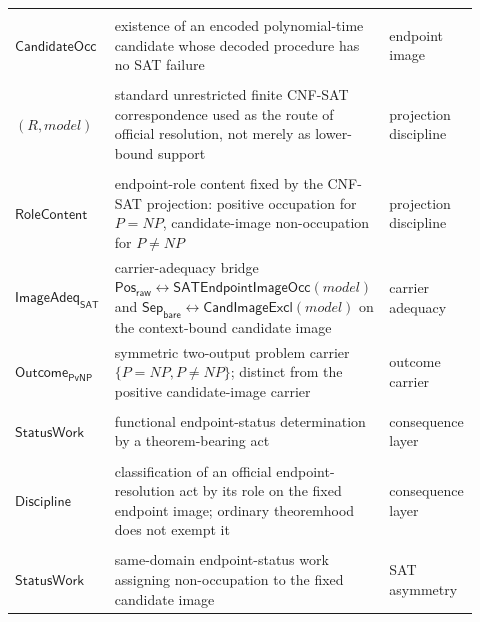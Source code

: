 \documentclass[11pt]{article}
\theoremstyle{definition}
\theoremstyle{remark}
\newcommand{\PosRaw}{\mathsf{Pos}_{\mathsf{raw}}}
\newcommand{\SepBare}{\mathsf{Sep}_{\mathsf{bare}}}
\newcommand{\CandImageExcl}{\mathsf{CandImageExcl}}
\newcommand{\SATEndpointImageOcc}{\mathsf{SATEndpointImageOcc}}
\newcommand{\OutcomePvNP}{\mathsf{Outcome}_{\mathsf{PvNP}}}
\newcommand{\ImageAdeq}{\mathsf{ImageAdeq}}
\begin{document}
\begin{longtable}{>{\raggedright\arraybackslash}p{0.21\linewidth}>{\raggedright\arraybackslash}p{0.54\linewidth}>{\raggedright\arraybackslash}p{0.17\linewidth}}
\begin{tabular}[t]{@{}l@{}}\(\mathsf{Positive}\)\\\(\mathsf{CandidateOcc}\)\end{tabular} & existence of an encoded polynomial-time candidate whose decoded procedure has no SAT failure & endpoint image \\
\begin{tabular}[t]{@{}l@{}}\(\mathsf{CNFRoute}\)\\\((R,model)\)\end{tabular} & standard unrestricted finite CNF-SAT correspondence used as the route of official resolution, not merely as lower-bound support & projection discipline \\
\begin{tabular}[t]{@{}l@{}}\(\mathsf{Projection}\)\\\(\mathsf{RoleContent}\)\end{tabular} & endpoint-role content fixed by the CNF-SAT projection: positive occupation for \(P=NP\), candidate-image non-occupation for \(P\neq NP\) & projection discipline \\
\(\ImageAdeq_{\mathsf{SAT}}\) & carrier-adequacy bridge \(\PosRaw\leftrightarrow\SATEndpointImageOcc(model)\) and \(\SepBare\leftrightarrow\CandImageExcl(model)\) on the context-bound candidate image & carrier adequacy \\
\(\OutcomePvNP\) & symmetric two-output problem carrier \(\{P=NP,P\neq NP\}\); distinct from the positive candidate-image carrier & outcome carrier \\
\begin{tabular}[t]{@{}l@{}}\(\mathsf{Endpoint}\)\\\(\mathsf{StatusWork}\)\end{tabular} & functional endpoint-status determination by a theorem-bearing act & consequence layer \\
\begin{tabular}[t]{@{}l@{}}\(\mathsf{EndpointRole}\)\\\(\mathsf{Discipline}\)\end{tabular} & classification of an official endpoint-resolution act by its role on the fixed endpoint image; ordinary theoremhood does not exempt it & consequence layer \\
\begin{tabular}[t]{@{}l@{}}\(\mathsf{NonPositive}\)\\\(\mathsf{StatusWork}\)\end{tabular} & same-domain endpoint-status work assigning non-occupation to the fixed candidate image & SAT asymmetry \\

\end{longtable}
\end{document}
